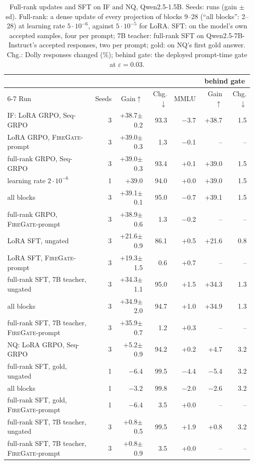 \documentclass{article}
\theoremstyle{plain}
\theoremstyle{definition}
\theoremstyle{remark}
\newcommand{\methodp}{\textsc{FireGate}-prompt}
\begin{document}
\begin{table}[t]
\centering
\small
\setlength{\tabcolsep}{3pt}
\caption{Full-rank updates and SFT on IF and NQ, Qwen2.5-1.5B. Seeds: runs (gain $\pm$ sd). Full-rank: a dense
update of every projection of blocks 9--28 (``all blocks'': 2--28) at learning rate $5\cdot10^{-6}$, against
$5\cdot10^{-5}$ for LoRA. SFT: on the model's own accepted samples, four per prompt; 7B teacher: full-rank SFT on
Qwen2.5-7B-Instruct's accepted responses, two per prompt; gold: on NQ's first gold answer. Chg.: Dolly responses
changed (\%); behind gate: the deployed prompt-time
gate at $\varepsilon=0.03$.}
\label{tab:pilot}
\begin{tabular}{l r rrr rr}
\toprule
 & & & & & \multicolumn{2}{c}{behind gate} \\
\cmidrule(lr){6-7}
Run & Seeds & Gain$\uparrow$ & Chg.$\downarrow$ & MMLU & Gain$\uparrow$ & Chg.$\downarrow$ \\
\midrule
IF: LoRA GRPO, Seq-GRPO & 3 & +38.7{\scriptsize$\pm$0.2} & 93.3 & $-$3.7 & +38.7 & 1.5 \\
LoRA GRPO, \methodp{} & 3 & +39.0{\scriptsize$\pm$0.3} & 1.3 & $-$0.1 & -- & -- \\
full-rank GRPO, Seq-GRPO & 3 & +39.0{\scriptsize$\pm$0.3} & 93.4 & +0.1 & +39.0 & 1.5 \\
\quad learning rate $2\cdot10^{-6}$ & 1 & +39.0 & 94.0 & +0.0 & +39.0 & 1.5 \\
\quad all blocks & 3 & +39.1{\scriptsize$\pm$0.1} & 95.0 & $-$0.7 & +39.1 & 1.5 \\
full-rank GRPO, \methodp{} & 3 & +38.9{\scriptsize$\pm$0.6} & 1.3 & $-$0.2 & -- & -- \\
LoRA SFT, ungated & 3 & +21.6{\scriptsize$\pm$0.9} & 86.1 & +0.5 & +21.6 & 0.8 \\
LoRA SFT, \methodp{} & 3 & +19.3{\scriptsize$\pm$1.5} & 0.6 & +0.7 & -- & -- \\
full-rank SFT, 7B teacher, ungated & 3 & +34.3{\scriptsize$\pm$1.1} & 95.0 & +1.5 & +34.3 & 1.3 \\
\quad all blocks & 3 & +34.9{\scriptsize$\pm$2.0} & 94.7 & +1.0 & +34.9 & 1.3 \\
full-rank SFT, 7B teacher, \methodp{} & 3 & +35.9{\scriptsize$\pm$0.7} & 1.2 & +0.3 & -- & -- \\
\midrule
NQ: LoRA GRPO, Seq-GRPO & 3 & +5.2{\scriptsize$\pm$0.9} & 94.2 & +0.2 & +4.7 & 3.2 \\
full-rank SFT, gold, ungated & 1 & $-$6.4 & 99.5 & $-$4.4 & $-$5.4 & 3.2 \\
\quad all blocks & 1 & $-$3.2 & 99.8 & $-$2.0 & $-$2.6 & 3.2 \\
full-rank SFT, gold, \methodp{} & 1 & $-$6.4 & 3.5 & +0.0 & -- & -- \\
full-rank SFT, 7B teacher, ungated & 3 & +0.8{\scriptsize$\pm$0.5} & 99.5 & +1.9 & +0.8 & 3.2 \\
full-rank SFT, 7B teacher, \methodp{} & 3 & +0.8{\scriptsize$\pm$0.9} & 3.5 & +0.0 & -- & -- \\
\bottomrule
\end{tabular}
\end{table}
\end{document}
